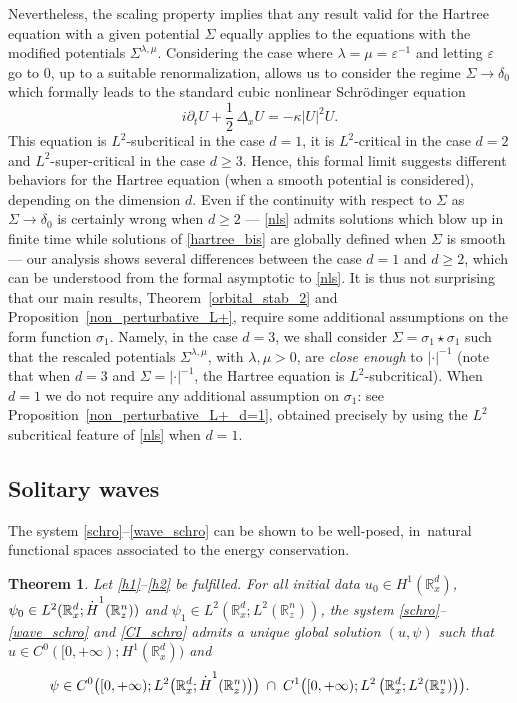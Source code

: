\documentclass[11pt]{article}
\let\epsilon\varepsilon
\DeclareRobustCommand{\accentset}[2]{\overset{#1}{#2}}
\newtheorem{theo}[lemma]{Theorem}
\theoremstyle{definition}
\newcommand*{\overbigdot}[1]{%
\accentset{\mbox{\large\bfseries .}}{#1}}
\newcommand{\R}{\mathbb{R}}
\begin{document}
Nevertheless, the scaling property implies that any result valid for the Hartree equation with a given potential $\Sigma$ equally applies
to the equations with the modified potentials $\Sigma^{\lambda,\mu}$. Considering the case where $\lambda=\mu=\epsilon^{-1}$ and letting
$\epsilon$ go to $ 0$, up to a suitable renormalization,
allows us to consider the regime $\Sigma\to\delta_{0}$ which formally leads to the standard cubic nonlinear Schrödinger equation
\begin{equation}\label{nls}
i\partial_{t} U+\frac{1}{2}\,\Delta_{x}U=-\kappa|U|^{2}U.
\end{equation}
This equation is $L^{2}$-subcritical in the case $d=1$, it is $L^{2}$-critical in the case $d=2$ and $L^{2}$-super-critical in the case $d\geq 3$. Hence, this formal limit suggests different behaviors for the Hartree equation (when a smooth potential is considered), depending on the dimension $d$.
Even if the continuity with respect to $\Sigma$ as $\Sigma\to\delta_{0}$ is certainly wrong when $d\geq 2$ --- \eqref{nls} admits solutions which blow up in finite time while solutions of \eqref{hartree_bis} are globally defined when $\Sigma$ is smooth --- our analysis shows several differences between the case $d=1$ and $d\geq 2$, which can be understood from the formal asymptotic to \eqref{nls}. It is thus not surprising that our main results, Theorem~\ref{orbital_stab_2} and Proposition~\ref{non_perturbative_L+}, require some additional assumptions on the form function $\sigma_{1}$. Namely, in the case $d=3$, we shall
consider $\Sigma=\sigma_{1}\star\sigma_{1}$ such that
the rescaled potentials $\Sigma^{\lambda,\mu}$, with $\lambda,\mu>0$, are \emph{close enough} to $|\cdot|^{-1}$ (note that when $d=3$ and $\Sigma=|\cdot|^{-1}$, the Hartree equation is $L^{2}$-subcritical). When $d=1$ we do not require any additional assumption on $\sigma_{1}$: see Proposition~\ref{non_perturbative_L+_d=1},
obtained precisely by using the $L^2$ subcritical feature of \eqref{nls} when $d=1$.

\subsection{Solitary waves}

The system \eqref{schro}--\eqref{wave_schro} can be shown to be well-posed,
in~natural functional spaces associated to the energy conservation.

\begin{theo}\label{TC}
Let \eqref{h1}--\eqref{h2} be fulfilled. For all initial data $u_{0}\in H^{1}(\R_{x}^{d})$, $\psi_{0}\in\nobreak L^{2}(\R_{x}^{d};\overbigdot{H}^{1}(\R_{z}^{n}))$ and $\psi_{1}\in L^{2}(\R_{x}^{d};L^{2}(\R_{z}^{n}))$, the system \eqref{schro}--\eqref{wave_schro} and \eqref{CI_schro} admits a unique global solution $(u,\psi)$ such that $u\in C^{0}([0,+\infty);H^{1}(\R_{x}^{d}))$ and
\[
\psi\in C^{0}\bigl([0,+\infty);L^{2}\bigl(\R_{x}^{d};\overbigdot{H}^{1}(\R_{z}^{n})\bigr)\bigr)\;\cap\;C^{1}\bigl([0,+\infty);L^{2}\left(\R_{x}^{d};L^{2}(\R_{z}^{n})\right)\bigr).
\]
\end{theo}
\end{document}
